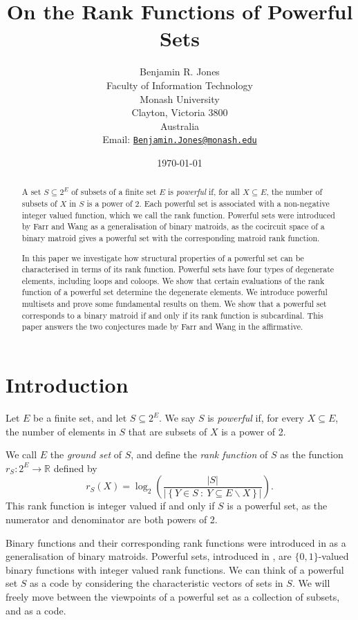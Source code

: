 \documentclass[10pt]{article}
\title{\vspace{-1.6cm}
	On the Rank Functions of Powerful Sets}
\author{Benjamin R. Jones   \\
	Faculty of Information Technology   \\
	Monash University   \\
	Clayton, Victoria 3800   \\
	Australia   \\
	Email: \href{mailto:Benjamin.Jones@monash.edu}{\texttt{Benjamin.Jones@monash.edu}}}
\date{\today}
\theoremstyle{definition}
\begin{document}
	\maketitle
	
	\begin{abstract}

	
	A set $S\subseteq 2^E$ of subsets of a finite set $E$ is \emph{powerful} if, for all $X\subseteq E$, the number of subsets of $X$ in $S$ is a power of 2. 
	Each powerful set is associated with a non-negative integer valued function, 
	which we call the rank function. 
	Powerful sets were introduced by Farr and Wang as a generalisation of binary matroids, as the cocircuit space of a binary matroid gives a powerful set with the corresponding matroid rank function.
	
	In this paper we investigate how structural properties of a powerful set can be characterised in terms of
	its rank function. Powerful sets have four types of degenerate elements, including loops and coloops. We show that certain evaluations of the rank function of a powerful set determine the degenerate elements.
	We introduce powerful multisets and prove some fundamental results on them. 
	We show that a powerful set corresponds to a binary matroid if and only if its rank function is subcardinal. This paper answers the two conjectures made by Farr and Wang in the affirmative.
	
	
	
		
	\end{abstract}
	

	
	
	\section{Introduction}
	\label{sec:intro}
	Let $E$ be a finite set, and let $S\subseteq 2^E$. We say $S$ is \emph{powerful} if, for every $X\subseteq E$, the number of elements in $S$ that are subsets of $X$ is a power of 2.
	
	We call $E$ the \emph{ground set} of $S$, and define the \emph{rank function} of $S$ as the function $r_S:2^E\to\mathbb{R}$ defined by
	\[r_S(X)=\log_2\left(\frac{|S|}{|\left\{Y\in S~:~Y\subseteq E\backslash{X}\right\}|}\right).\]
	This rank function is integer valued if and only if $S$ is a powerful set, as the numerator and denominator are both powers of 2.
	
    Binary functions and their corresponding rank functions were introduced in \cite{farr93} as a generalisation of binary matroids. Powerful sets, introduced in \cite{farr2017}, are $\{0,1\}$-valued binary functions with integer valued rank functions.  We can think of a powerful set $S$ as a code by considering the characteristic vectors of sets in $S$. We will freely move between the viewpoints of a powerful set as a collection of subsets, and as a code.
		
\end{document}
